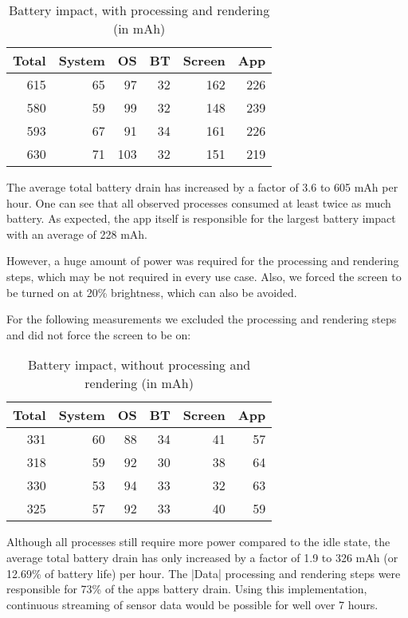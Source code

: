 \begin{table}[H]
    \centering
    \begin{tabular}{rrrrrr}
        Total    & System   & OS       & BT       & Screen   & App  \\ \hline

        615      & 65       & 97       & 32       & 162      & 226  \\
        580      & 59       & 99       & 32       & 148      & 239  \\
        593      & 67       & 91       & 34       & 161      & 226  \\
        630      & 71       & 103      & 32       & 151      & 219  \\
    \end{tabular}
    \caption{Battery impact, with processing and rendering (in mAh)}
    \label{table:benchmark:battery:screen}
\end{table}

The average total battery drain has increased by a factor of 3.6 to 605 mAh per hour.
One can see that all observed processes consumed at least twice as much battery.
As expected, the app itself is responsible for the largest battery impact with an average of 228 mAh.

However, a huge amount of power was required for the processing and rendering steps, which may be not required in every use case.
Also, we forced the screen to be turned on at 20\% brightness, which can also be avoided.

\clearpage

For the following measurements we excluded the processing and rendering steps and did not force the screen to be on:

\begin{table}[H]
    \centering
    \begin{tabular}{rrrrrr}
        Total    & System   & OS       & BT       & Screen   & App  \\ \hline

        331      & 60       & 88       & 34       & 41       & 57   \\
        318      & 59       & 92       & 30       & 38       & 64   \\
        330      & 53       & 94       & 33       & 32       & 63   \\
        325      & 57       & 92       & 33       & 40       & 59   \\
    \end{tabular}
    \caption{Battery impact, without processing and rendering (in mAh)}
    \label{table:benchmark:battery:noscreen}
\end{table}

Although all processes still require more power compared to the idle state, the average total battery drain has only increased by a factor of 1.9 to 326 mAh (or 12.69\% of battery life) per hour.
The |Data| processing and rendering steps were responsible for 73\% of the apps battery drain.
Using this implementation, continuous streaming of sensor data would be possible for well over 7 hours.

\clearpage